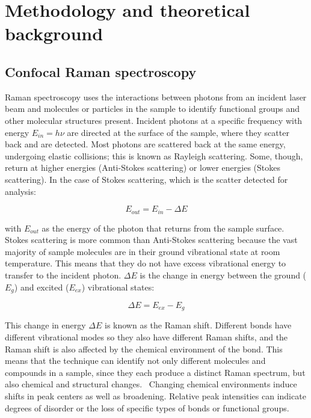 



\section[Methodology and theoretical background]{Methodology and theoretical background}
\label{section1.2}

\subsection[Confocal Raman spectroscopy]{Confocal Raman spectroscopy}
\label{subsection1.2.1}

Raman spectroscopy uses the interactions between photons from an incident laser beam and molecules or particles in the sample to identify functional groups and other molecular structures present. Incident photons at a specific frequency with energy $E_{in} = h\nu$ are directed at the surface of the sample, where they scatter back and are detected. Most photons are scattered back at the same energy, undergoing elastic collisions; this is known as Rayleigh scattering. Some, though, return at higher energies (Anti-Stokes scattering) or lower energies (Stokes scattering). In the case of Stokes scattering, which is the scatter detected for analysis:

\begin{equation} \label{eq:raman_1}
E_{out} = E_{in} - \Delta E
\end{equation}

with $E_{out}$ as the energy of the photon that returns from the sample surface. Stokes scattering is more common than Anti-Stokes scattering because the vast majority of sample molecules are in their ground vibrational state at room temperature. This means that they do not have excess vibrational energy to transfer to the incident photon. $\Delta E$ is the change in energy between the ground ($E_{g}$) and excited ($E_{ex}$) vibrational states:

\begin{equation} \label{eq:raman_2}
\Delta E = E_{ex} - E_{g}
\end{equation}

This change in energy $\Delta E$ is known as the Raman shift. Different bonds have different vibrational modes so they also have different Raman shifts, and the Raman shift is also affected by the chemical environment of the bond. This means that the technique can identify not only different molecules and compounds in a sample, since they each produce a distinct Raman spectrum, but also chemical and structural changes.~\autocite{2018RS,horiba,matousek_tissue} Changing chemical environments induce shifts in peak centers as well as broadening. Relative peak intensities can indicate degrees of disorder or the loss of specific types of bonds or functional groups.~\autocite{tomasini_raman}

